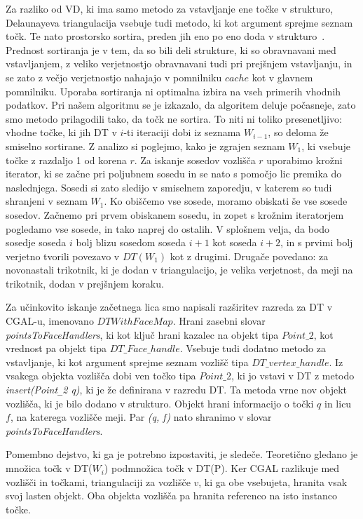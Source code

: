 \documentclass[a4paper, 12pt]{book}
\newcommand{\U}{\texttt{\_}}
\begin{document}
Za razliko od VD, ki ima samo metodo za vstavljanje ene točke v strukturo, Delaunayeva triangulacija vsebuje tudi metodo, ki kot argument sprejme seznam točk. Te nato prostorsko sortira, preden jih eno po eno doda v strukturo~\cite{cgal:dd-ss-15a}. Prednost sortiranja je v tem, da so bili deli strukture, ki so obravnavani med vstavljanjem, z veliko verjetnostjo obravnavani tudi pri prejšnjem vstavljanju, in se zato z večjo verjetnostjo nahajajo v pomnilniku $cache$ kot v glavnem pomnilniku. Uporaba sortiranja ni optimalna izbira na vseh primerih vhodnih podatkov. Pri našem algoritmu se je izkazalo, da algoritem deluje počasneje, zato smo metodo prilagodili tako, da točk ne sortira. To niti ni toliko presenetljivo: vhodne točke, ki jih DT v $i$-ti iteraciji dobi iz seznama $W_{i-1}$, so deloma že smiselno sortirane. Z analizo si poglejmo, kako je zgrajen seznam $W_1$, ki vsebuje točke z razdaljo 1 od korena $r$. Za iskanje sosedov vozlišča $r$  uporabimo krožni iterator, ki se začne pri poljubnem sosedu in se nato s pomočjo lic premika do naslednjega. Sosedi si zato sledijo v smiselnem zaporedju, v katerem so tudi shranjeni v seznam $W_1$. Ko obiščemo vse sosede, moramo obiskati še vse sosede sosedov. Začnemo pri prvem obiskanem sosedu, in zopet s krožnim iteratorjem pogledamo vse sosede, in tako naprej do ostalih. V splošnem velja, da bodo sosedje soseda $i$ bolj blizu sosedom soseda $i+1$ kot soseda $i+2$, in s prvimi bolj verjetno tvorili povezavo v $DT(W_1)$ kot z drugimi. Drugače povedano: za novonastali trikotnik, ki je dodan v triangulacijo, je velika verjetnost, da meji na trikotnik, dodan v prejšnjem koraku.

\bigbreak

Za učinkovito iskanje začetnega lica smo napisali razširitev razreda za DT v CGAL-u, imenovano $DTWithFaceMap$. Hrani zasebni slovar \textit{pointsToFaceHandlers}, ki kot ključ hrani kazalec na objekt tipa $Point\U 2$, kot vrednost pa objekt tipa $DT\U Face\U handle$. Vsebuje tudi dodatno metodo za vstavljanje, ki kot argument sprejme seznam vozlišč tipa $DT\U vertex\U handle$. Iz vsakega objekta vozlišča dobi ven točko tipa $Point\U 2$, ki jo vstavi v DT z metodo \textit{insert(Point\U 2 q)}, ki je že definirana  v razredu DT. Ta metoda vrne nov objekt vozlišča, ki je bilo dodano v strukturo. Objekt hrani informacijo o točki $q$ in licu $f$, na katerega vozlišče meji. Par \textit{(q, f)} nato shranimo v slovar \textit{pointsToFaceHandlers}.

Pomembno dejstvo, ki ga je potrebno izpostaviti, je sledeče. Teoretično gledano je množica točk v DT($W_i$) podmnožica točk v DT(P). Ker CGAL razlikuje med vozlišči in točkami, triangulaciji za vozlišče $v$, ki ga obe vsebujeta, hranita vsak svoj lasten objekt. Oba objekta vozlišča pa hranita referenco na isto instanco točke.
\end{document}
